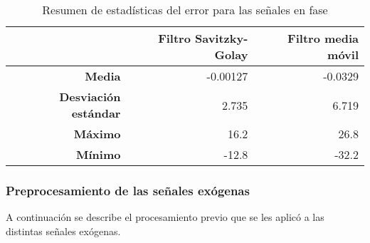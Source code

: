 \begin{table}[H]
	\centering
	\begin{tabular}{rr|r}
		\hline \hline
		&	Filtro Savitzky-Golay 	&  Filtro media móvil 	\\
		\hline
		\textbf{Media}   				& -0.00127	& -0.0329 	\\
		\textbf{Desviación estándar}    & 2.735  	& 6.719  	\\
		\textbf{Máximo} 				& 16.2		& 26.8 		\\
		\textbf{Mínimo} 				& -12.8 	& -32.2 	\\ 
		\hline \hline
	\end{tabular}
	\caption{Resumen de estadísticas del error para las señales en fase}
	\label{table:y_error_fase}
\end{table}







\subsubsection*{Preprocesamiento de las señales exógenas}

A continuación se describe el procesamiento previo que se les aplicó a las distintas señales exógenas.

